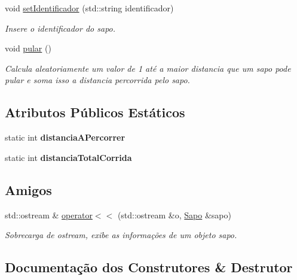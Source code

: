 \begin{DoxyCompactItemize}
void \hyperlink{classSapo_a617cde091fd409e66caacee5bf079e05}{set\+Identificador} (std\+::string identificador)
\begin{DoxyCompactList}\small\item\em Insere o identificador do sapo. \end{DoxyCompactList}\item 
void \hyperlink{classSapo_a32e61c61677967120ae652099bd56805}{pular} ()
\begin{DoxyCompactList}\small\item\em Calcula aleatoriamente um valor de 1 até a maior distancia que um sapo pode pular e soma isso a distancia percorrida pelo sapo. \end{DoxyCompactList}\end{DoxyCompactItemize}
\subsection*{Atributos Públicos Estáticos}
\begin{DoxyCompactItemize}
\item 
\mbox{\label{classSapo_a5ac5381b9ab3b53a378dacdbed9f3646}} 
static int {\bfseries distancia\+A\+Percorrer}
\item 
\mbox{\label{classSapo_a2b386c68fc09ec9339723dadec0f61f4}} 
static int {\bfseries distancia\+Total\+Corrida}
\end{DoxyCompactItemize}
\subsection*{Amigos}
\begin{DoxyCompactItemize}
\item 
std\+::ostream \& \hyperlink{classSapo_a295992e9cef7ed41031bd2a0a9e70646}{operator$<$$<$} (std\+::ostream \&o, \hyperlink{classSapo}{Sapo} \&sapo)
\begin{DoxyCompactList}\small\item\em Sobrecarga de ostream, exibe as informações de um objeto sapo. \end{DoxyCompactList}\end{DoxyCompactItemize}


\subsection{Documentação dos Construtores \& Destrutor}
\mbox{\label{classSapo_a402f1c5435dd13180835b3b847e4bd7c}} 
